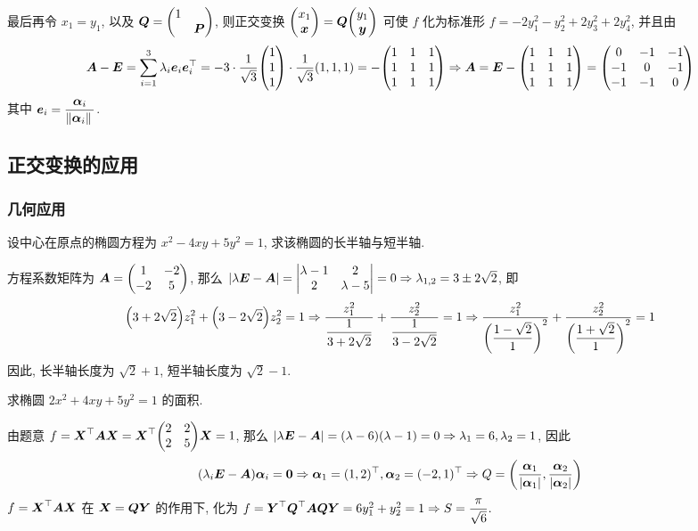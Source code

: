 \begin{solution}
    最后再令 $x_1=y_1$, 以及 $\vb*{Q}=\mqty(1\\&\vb*{P})$, 则正交变换 $\mqty(x_1\\\vb*{x})=\vb*{Q}\mqty(y_1\\\vb*{y})$ 可使 $f$ 化为标准形 $f=-2y_1^2-y_2^2+2y_3^2+2y_4^2$, 并且由
    $$\vb*{A}-\vb*{E}=\sum_{i=1}^{3}\lambda_i\vb*{e}_i\vb*{e}_i^\top=-3\cdot\dfrac{1}{\sqrt{3}}\mqty(1\\1\\1)\cdot\dfrac{1}{\sqrt{3}}(1,1,1)=-\mqty(1&1&1\\1&1&1\\1&1&1)\Rightarrow \vb*{A}=\vb*{E}-\mqty(1&1&1\\1&1&1\\1&1&1)=\mqty(0&-1&-1\\-1&0&-1\\-1&-1&0)$$
    其中 $\vb*{e}_i=\dfrac{\vb*{\alpha}_i}{\norm*{\vb*{\alpha}_i}}$.
\end{solution}

\subsection{正交变换的应用}

\subsubsection{几何应用}

\begin{example}
    设中心在原点的椭圆方程为 $x^2-4xy+5y^2=1$, 求该椭圆的长半轴与短半轴.
\end{example}
\begin{solution}
    方程系数矩阵为 $\vb*{A}=\mqty(1&-2\\-2&5)$, 那么 $|\lambda\vb*{E}-\vb*{A}|=\mqty|\lambda-1 & 2\\2&\lambda-5|=0\Rightarrow \lambda_{1,2}=3\pm 2\sqrt{2}$, 即
    $$\qty(3+2\sqrt{2})z_1^2+\qty(3-2\sqrt{2})z_2^2=1\Rightarrow \dfrac{z_1^2}{\dfrac{1}{3+2\sqrt{2}}}+\dfrac{z_2^2}{\dfrac{1}{3-2\sqrt{2}}}=1\Rightarrow \dfrac{z_1^2}{\qty(\dfrac{1-\sqrt{2}}{1})^2}+\dfrac{z_2^2}{\qty(\dfrac{1+\sqrt{2}}{1})^2}=1$$
    因此, 长半轴长度为 $\sqrt{2}+1$, 短半轴长度为 $\sqrt{2}-1.$
\end{solution}

\begin{example}
    求椭圆 $2x^2+4xy+5y^2=1$ 的面积.
\end{example}
\begin{solution}
    由题意 $f=\vb*{X}^\top\vb*{AX}=\vb*{X}^\top\mqty(2&2\\2&5)\vb*{X}=1$, 那么 $|\lambda \vb*{E}-\vb*{A}|=(\lambda-6)(\lambda-1)=0\Rightarrow \lambda_1=6,\lambda_2=1$, 因此
    $$(\lambda_i\vb*{E}-\vb*{A})\vb*{\alpha}_i=\vb*{0}\Rightarrow \vb*{\alpha}_1=(1,2)^\top,\vb*{\alpha}_2=(-2,1)^\top\Rightarrow Q=\qty(\dfrac{\vb*{\alpha}_1}{|\vb*{\alpha}_1|},\dfrac{\vb*{\alpha}_2}{|\vb*{\alpha}_2|})$$
    $f=\vb*{X}^\top\vb*{AX}$ 在 $\vb*{X}=\vb*{QY}$ 的作用下, 化为 $f=\vb*{Y}^\top\vb*{Q}^\top\vb*{AQY}=6y_1^2+y_2^2=1\Rightarrow S=\dfrac{\pi}{\sqrt{6}}.$
\end{solution}

